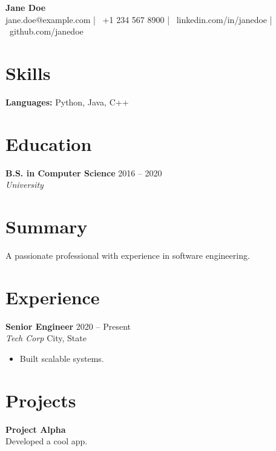 \documentclass[11pt,a4paper]{article}
\begin{document}
\noindent
\begin{minipage}[t]{\textwidth}
    {\Huge \textbf{Jane Doe}} \\
    {{\footnotesize jane.doe@example.com | \faPhone\ +1 234 567 8900 | \faLinkedin\ linkedin.com/in/janedoe | \faGithub\ github.com/janedoe}}
\end{minipage}

\vspace{5mm}

\noindent
\begin{minipage}[t]{0.3\textwidth}
    \section*{Skills}
    \textbf{Languages:} Python, Java, C++
    
    \vspace{5mm}
    
    \section*{Education}
    \textbf{B.S. in Computer Science} \hfill 2016 -- 2020 \\ \textit{University}
\end{minipage}
\hfill
\begin{minipage}[t]{0.65\textwidth}
    \section*{Summary}
    {\footnotesize A passionate professional with experience in software engineering.}

    \section*{Experience}
    \textbf{Senior Engineer} \hfill 2020 -- Present \\ \textit{Tech Corp} \hfill City, State \begin{itemize}[noitemsep] \footnotesize \item Built scalable systems. \end{itemize}

    \section*{Projects}
    \textbf{Project Alpha} \\ {\footnotesize Developed a cool app.}
\end{minipage}
\end{document}
